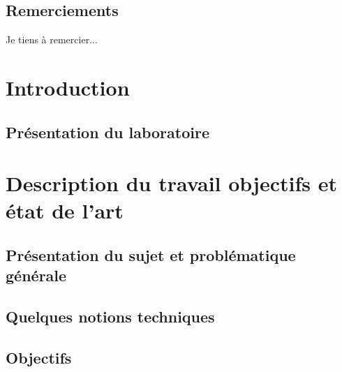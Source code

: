 \documentclass[11pt]{report}
\theoremstyle{definition}
\theoremstyle{remark}
\begin{document}
\newpage
\thispagestyle{empty}
\mbox{}

\newpage
\section*{Remerciements}

Je tiens à remercier...
\newpage

\tableofcontents

\newpage

\listoffigures
{}

\newpage

\listoftables
{}

\newpage

\newpage
\chapter{Introduction}
\section{Présentation du laboratoire}


\newpage
\chapter{Description du travail objectifs et état de l'art}
    
    \section{Présentation du sujet et problématique générale}
    
    \newpage
    \section{Quelques notions techniques}
    
    \newpage
    \section{Objectifs}
    
\end{document}
